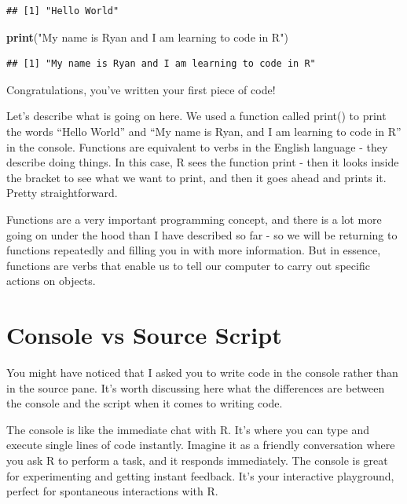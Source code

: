 \documentclass[
]{book}
\newenvironment{Shaded}{\begin{snugshade}}{\end{snugshade}}
\newcommand{\FunctionTok}[1]{\textcolor[rgb]{0.13,0.29,0.53}{\textbf{#1}}}
\newcommand{\NormalTok}[1]{#1}
\newcommand{\StringTok}[1]{\textcolor[rgb]{0.31,0.60,0.02}{#1}}
\begin{document}
\begin{verbatim}
## [1] "Hello World"
\end{verbatim}

\begin{Shaded}
\begin{Highlighting}[]
\FunctionTok{print}\NormalTok{(}\StringTok{"My name is Ryan and I am learning to code in R"}\NormalTok{)}
\end{Highlighting}
\end{Shaded}

\begin{verbatim}
## [1] "My name is Ryan and I am learning to code in R"
\end{verbatim}

Congratulations, you've written your first piece of code!

Let's describe what is going on here. We used a function called print() to print the words ``Hello World'' and ``My name is Ryan, and I am learning to code in R'' in the console. Functions are equivalent to verbs in the English language - they describe doing things. In this case, R sees the function print - then it looks inside the bracket to see what we want to print, and then it goes ahead and prints it. Pretty straightforward.

Functions are a very important programming concept, and there is a lot more going on under the hood than I have described so far - so we will be returning to functions repeatedly and filling you in with more information. But in essence, functions are verbs that enable us to tell our computer to carry out specific actions on objects.

\hypertarget{console-vs-source-script}{%
\section{Console vs Source Script}\label{console-vs-source-script}}

You might have noticed that I asked you to write code in the console rather than in the source pane. It's worth discussing here what the differences are between the console and the script when it comes to writing code.

The console is like the immediate chat with R. It's where you can type and execute single lines of code instantly. Imagine it as a friendly conversation where you ask R to perform a task, and it responds immediately. The console is great for experimenting and getting instant feedback. It's your interactive playground, perfect for spontaneous interactions with R.
\end{document}
